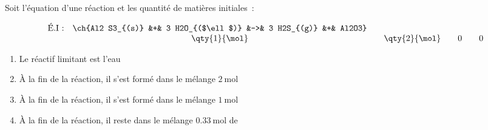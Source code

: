 Soit l'équation d'une réaction et les quantité de matières initiales~:

\[
    \begin{array}{lccccccc}
        \text{É.I~:} & \ch{Al2 S3_{(s)} &+& 3 H2O_{($\ell$)} &->& 3 H2S_{(g)} &+& Al2O3} \\
                     & \qty{1}{\mol} && \qty{2}{\mol} && 0 && 0 \\
    \end{array}
\]
\begin{enumerate}
    \item Le réactif limitant est l'eau \dotfill \V\F
    \item À la fin de la réaction, il s'est formé dans le mélange
          $\qty{2}{\mol}$  \dotfill \V\F
    \item À la fin de la réaction, il s'est formé dans le mélange
          $\qty{1}{\mol}$  \dotfill \V\F
    \item À la fin de la réaction, il reste dans le mélange $\qty{0.33}{\mol}$
          de  \dotfill \V\F
\end{enumerate}


